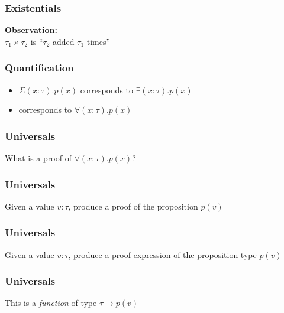 \documentclass[usenames,dvipsnames]{beamer}
\begin{document}

\begin{frame}
  \frametitle{Existentials}

  \textbf{Observation:} \\
  $\tau_1 \times \tau_2$ is ``$\tau_2$ added $\tau_1$ times''
\end{frame}


\begin{frame}
  \frametitle{Quantification}

  \begin{itemize}
    \item $\Sigma(x:\tau).p(x)$ corresponds to $\exists (x:\tau) . p(x)$
    \item \phantom{$\Pi(x:\tau).p(x)$}
      corresponds to $\forall (x:\tau) . p(x)$
  \end{itemize}
\end{frame}


\begin{frame}
  \frametitle{Universals}

  What is a proof of $\forall (x:\tau) . p(x)$?
\end{frame}


\begin{frame}
  \frametitle{Universals}

  Given a value $v:\tau$, produce a proof of the proposition $p(v)$
\end{frame}


\begin{frame}
  \frametitle{Universals}

  Given a value $v:\tau$, produce a \sout{proof} expression of \sout{the proposition}
  type $p(v)$
\end{frame}


\begin{frame}
  \frametitle{Universals}

  This is a \emph{function} of type $\tau \rightarrow p(v)$
\end{frame}

\end{document}
